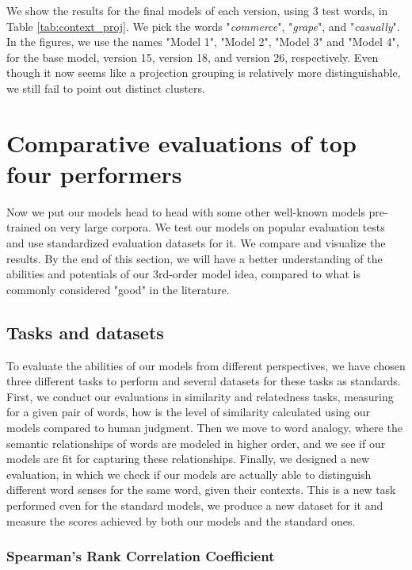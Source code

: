 We show the results for the final models of each version, using 3 test words, in Table \ref{tab:context_proj}. We pick the words "\textit{commerce}", "\textit{grape}", and "\textit{casually}". In the figures, we use the names "Model 1", "Model 2", "Model 3" and "Model 4", for the base model, version 15, version 18, and version 26, respectively. Even though it now seems like a projection grouping is relatively more distinguishable, we still fail to point out distinct clusters. 

\section{Comparative evaluations of top four performers}

Now we put our models head to head with some other well-known models pre-trained on very large corpora. We test our models on popular evaluation tests and use standardized evaluation datasets for it. We compare and visualize the results. By the end of this section, we will have a better understanding of the abilities and potentials of our 3rd-order model idea, compared to what is commonly considered "good" in the literature.

\subsection{Tasks and datasets}
\label{sec:tasks_datasets}

To evaluate the abilities of our models from different perspectives, we have chosen three different tasks to perform and several datasets for these tasks as standards. First, we conduct our evaluations in similarity and relatedness tasks, measuring for a given pair of words, how is the level of similarity calculated using our models compared to human judgment. Then we move to word analogy, where the semantic relationships of words are modeled in higher order, and we see if our models are fit for capturing these relationships. Finally, we designed a new evaluation, in which we check if our models are actually able to distinguish different word senses for the same word, given their contexts. This is a new task performed even for the standard models, we produce a new dataset for it and measure the scores achieved by both our models and the standard ones.

\subsubsection{Spearman's Rank Correlation Coefficient}

